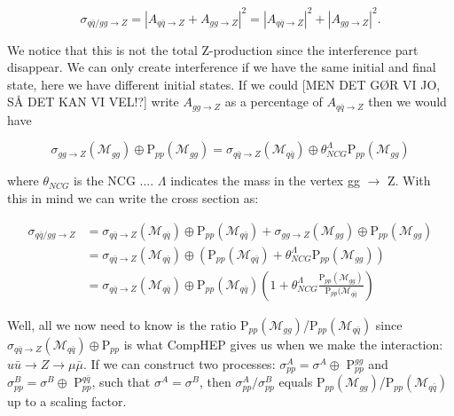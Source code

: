 \begin{equation}
\sigma_{q \bar q/gg \rightarrow Z} = |A_{q \bar q \rightarrow Z} + A_{gg \rightarrow Z}|^{2}=|A_{q \bar q \rightarrow Z}|^{2}+|A_{gg \rightarrow Z}|^{2}.
\end{equation}

We notice that this is not the total Z-production since the interference part disappear. We can only create interference if we have the same initial and final state, here we have different initial states. If we could [MEN DET GØR VI JO, SÅ DET KAN VI VEL!?] write $A_{gg \rightarrow Z}$ as a percentage of $A_{q \bar q \rightarrow Z}$ then we would have

\begin{equation}
\sigma_{gg\rightarrow Z} (\mathcal{M}_{gg}) \oplus \textrm{P}_{pp}(\mathcal{M}_{gg})=\sigma_{q \bar q\rightarrow Z}(\mathcal{M}_{q \bar q}) \oplus \theta_{NCG}^{\Lambda}\textrm{P}_{pp}(\mathcal{M}_{gg})
\end{equation}

where $\theta_{NCG}$ is the NCG .... $\Lambda$ indicates the mass in the vertex gg $\rightarrow$ Z. With this in mind we can write the cross section as:

\begin{align}
\sigma_{q \bar q/gg \rightarrow Z} &= \sigma_{q \bar q \rightarrow Z} (\mathcal{M}_{q \bar q}) \oplus \textrm{P}_{pp}(\mathcal{M}_{q \bar q})+ \sigma_{gg\rightarrow Z} (\mathcal{M}_{gg}) \oplus \textrm{P}_{pp}(\mathcal{M}_{gg})\nonumber \\ 
&= \sigma_{q \bar q\rightarrow Z}(\mathcal{M}_{q \bar q}) \oplus (\textrm{P}_{pp}(\mathcal{M}_{q \bar q})+\theta_{NCG}^{\Lambda}\textrm{P}_{pp}(\mathcal{M}_{gg}))\nonumber \\ 
&= \sigma_{q \bar q\rightarrow Z}(\mathcal{M}_{q \bar q}) \oplus \textrm{P}_{pp}(\mathcal{M}_{q \bar q}) \left ( 1+\theta_{NCG}^{\Lambda}\frac{\textrm{P}_{pp}(\mathcal{M}_{gg})}{\textrm{P}_{pp}(\mathcal{M}_{q \bar q}} \right )
\end{align}

Well, all we now need to know is the ratio P$_{pp}(\mathcal{M}_{gg})$/P$_{pp}(\mathcal{M}_{q \bar q})$ since $ \sigma_{q \bar q\rightarrow Z}(\mathcal{M}_{q \bar q}) \oplus \textrm{P}_{pp}$ is what CompHEP gives us when we make the interaction: $u \bar u \rightarrow Z \rightarrow \mu \bar \mu $. If we can construct two processes: $\sigma_{pp}^{A}=\sigma^{A} \oplus$ P$_{pp}^{gg}$ and $\sigma_{pp}^{B}=\sigma^{B} \oplus$ P$_{pp}^{q \bar q}$, such that $\sigma^{A}=\sigma^{B}$, then $\sigma_{pp}^{A}/\sigma_{pp}^{B}$ equals  P$_{pp}(\mathcal{M}_{gg})$/P$_{pp}(\mathcal{M}_{q \bar q})$ up to a scaling factor.

